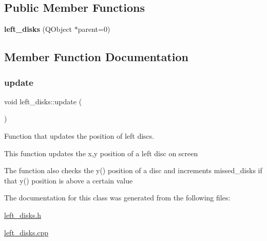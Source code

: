 \subsection*{Public Member Functions}
\begin{DoxyCompactItemize}
\item 
\mbox{\label{classleft__disks_a45551856594caed4f92a81a4a4d7bd4d}} 
{\bfseries left\+\_\+disks} (Q\+Object $\ast$parent=0)
\end{DoxyCompactItemize}


\subsection{Member Function Documentation}
\mbox{\label{classleft__disks_a613675662c3b7d427671ca6aa2aa4fc4}} 
\subsubsection{\texorpdfstring{update}{update}}
{\footnotesize\ttfamily void left\+\_\+disks\+::update (\begin{DoxyParamCaption}{ }\end{DoxyParamCaption})\hspace{0.3cm}{\ttfamily [slot]}}



Function that updates the position of left discs. 

This function updates the x,y position of a left disc on screen

The function also checks the y() position of a disc and increments missed\+\_\+disks if that y() position is above a certain value 

The documentation for this class was generated from the following files\+:\begin{DoxyCompactItemize}
\item 
\hyperlink{left__disks_8h}{left\+\_\+disks.\+h}\item 
\hyperlink{left__disks_8cpp}{left\+\_\+disks.\+cpp}\end{DoxyCompactItemize}
